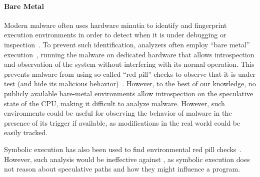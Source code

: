 \paragraph{Bare Metal}
Modern malware often uses hardware minutia to identify and fingerprint execution
environments in order to detect when it is under debugging or
inspection~\cite{lindorfer2011detecting,balzarotti2010efficient,paleari2009fistful}.
To prevent such identification, analyzers often employ ``bare metal''
execution~\cite{kirat2011barebox}, running the malware on
dedicated hardware that allows introspection and observation of the system
without interfering with its normal operation. This prevents malware from using
so-called ``red pill'' checks to observe that it is under test (and hide its
malicious behavior)~\cite{kirat2014barecloud}. However, to the best of our
knowledge, no publicly available bare-metal environments allow introspection on
the speculative state of the CPU, making it difficult to analyze \speculake
malware. However, such environments could be useful for observing the behavior of
\speculake malware in the presence of its trigger if available, as modifications
in the real world could be easily tracked.


Symbolic execution has also been used to find
environmental red pill checks~\cite{schwartz2010all}. However, such analysis
would be ineffective against \speculake, as symbolic execution does not reason
about speculative paths and how they might influence a program.

%
%


